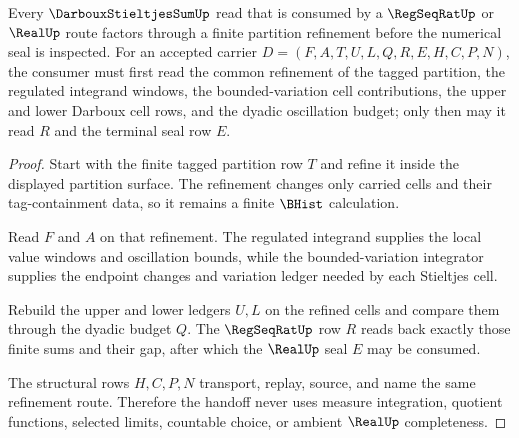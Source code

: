 \begin{theorem}
\label{thm:darboux-stieltjes-sum-regseqrat-handoff}
Every $\DarbouxStieltjesSumUp$ read that is consumed by a $\RegSeqRatUp$ or $\RealUp$ route factors through a finite partition refinement before the numerical seal is inspected. For an accepted carrier $D=(F,A,T,U,L,Q,R,E,H,C,P,N)$, the consumer must first read the common refinement of the tagged partition, the regulated integrand windows, the bounded-variation cell contributions, the upper and lower Darboux cell rows, and the dyadic oscillation budget; only then may it read $R$ and the terminal seal row $E$.
\end{theorem}
\begin{proof}
Start with the finite tagged partition row $T$ and refine it inside the displayed partition surface. The refinement changes only carried cells and their tag-containment data, so it remains a finite $\BHist$ calculation.

Read $F$ and $A$ on that refinement. The regulated integrand supplies the local value windows and oscillation bounds, while the bounded-variation integrator supplies the endpoint changes and variation ledger needed by each Stieltjes cell.

Rebuild the upper and lower ledgers $U,L$ on the refined cells and compare them through the dyadic budget $Q$. The $\RegSeqRatUp$ row $R$ reads back exactly those finite sums and their gap, after which the $\RealUp$ seal $E$ may be consumed.

The structural rows $H,C,P,N$ transport, replay, source, and name the same refinement route. Therefore the handoff never uses measure integration, quotient functions, selected limits, countable choice, or ambient $\RealUp$ completeness.
\end{proof}


\begin{closurestatus}{\DarbouxStieltjesSumUp}
  \theoryclosure{\seedClosure}
  \formalstatus{\unformalizedV}
\end{closurestatus}
